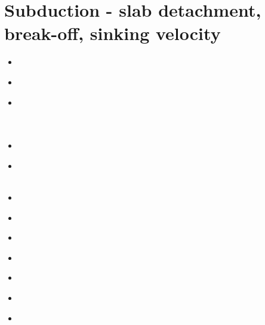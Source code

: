 \section{Subduction - slab detachment, break-off, sinking velocity}

\begin{scriptsize}
\begin{itemize}
\item[\nineteeneightyfive] 
\textcite{futo85} \\
\item[\nineteenninetytwo] 
\textcite{wosp92} \\
\item[\nineteenninetyfive] 
\textcite{yowo95} \\
\textcite{voda95} \\
\textcite{davo95} \\
\item[\nineteenninetyseven] 
\textcite{wowo97} \\
\item[\nineteenninetyeight] 
\textcite{desw98} \\
\textcite{caws98} \\
\item[\twothousand] 
\textcite{wosp00} \\
\item[\twothousandtwo] 
\textcite{bugw02} \\
\item[\twothousandfour] 
\textcite{geym04} \\
\item[\twothousandfive] 
\textcite{mozl05} \\
\item[\twothousandsix] 
\textcite{fabm06} \\
\item[\twothousandeight] 
\textcite{zlfd08} \\
\item[\twothousandnine] 
\textcite{anbi09} \\

\end{itemize}
\end{scriptsize}
